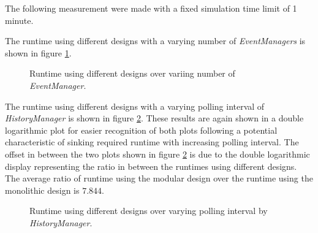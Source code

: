 The following measurement were made with a fixed simulation time limit of 1 minute.

The runtime using different designs with a varying number of \emph{EventManagers} is shown in figure \ref{fig:results_runtime_eventmanager}.
\\

\begin{figure}
    \centering
    \caption{Runtime using different designs over variing number of \emph{EventManager}.}
    \label{fig:results_runtime_eventmanager}
\end{figure}

The runtime using different designs with a varying polling interval of \emph{HistoryManager} is shown in figure \ref{fig:results_runtime_polling}.
These results are again shown in a double logarithmic plot for easier recognition of both plots following a potential characteristic of sinking required runtime with increasing polling interval.
The offset in between the two plots shown in figure \ref{fig:results_runtime_polling} is due to the double logarithmic display representing the ratio in between the runtimes using different designs.
The average ratio of runtime using the modular design over the runtime using the monolithic design is $7.844$.
\\
\begin{figure}
    \centering
    \caption{Runtime using different designs over varying polling interval by \emph{HistoryManager}.}
    \label{fig:results_runtime_polling}
\end{figure}

